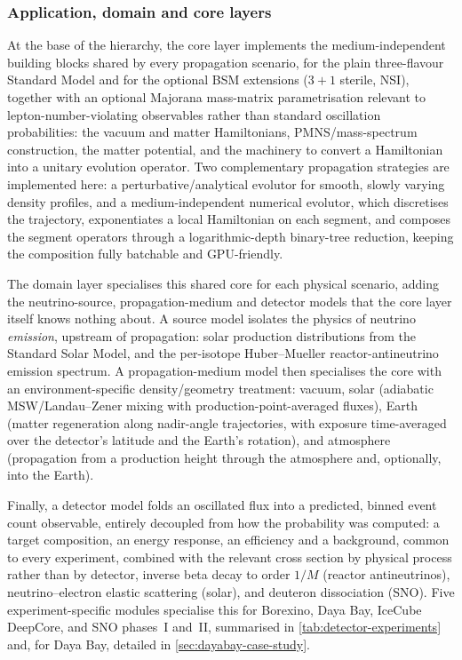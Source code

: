 \subsubsection{Application, domain and core layers}

At the base of the hierarchy, the core layer implements the medium-independent building blocks shared by every propagation scenario, for the plain three-flavour Standard Model and for the optional BSM extensions (\(3+1\) sterile, NSI), together with an optional Majorana mass-matrix parametrisation relevant to lepton-number-violating observables rather than standard oscillation probabilities: the vacuum and matter Hamiltonians, PMNS/mass-spectrum construction, the matter potential, and the machinery to convert a Hamiltonian into a unitary evolution operator. Two complementary propagation strategies are implemented here: a perturbative/analytical evolutor for smooth, slowly varying density profiles, and a medium-independent numerical evolutor, which discretises the trajectory, exponentiates a local Hamiltonian on each segment, and composes the segment operators through a logarithmic-depth binary-tree reduction, keeping the composition fully batchable and GPU-friendly.

The domain layer specialises this shared core for each physical scenario, adding the neutrino-source, propagation-medium and detector models that the core layer itself knows nothing about. A source model isolates the physics of neutrino \emph{emission}, upstream of propagation: solar production distributions from the Standard Solar Model, and the per-isotope Huber--Mueller \parencite{Huber2011,Mueller2011} reactor-antineutrino emission spectrum. A propagation-medium model then specialises the core with an environment-specific density/geometry treatment: vacuum, solar (adiabatic MSW/Landau--Zener mixing with production-point-averaged fluxes), Earth (matter regeneration along nadir-angle trajectories, with exposure time-averaged over the detector's latitude and the Earth's rotation), and atmosphere (propagation from a production height through the atmosphere and, optionally, into the Earth).

\label{sec:detector-layer}
Finally, a detector model folds an oscillated flux into a predicted, binned event count observable, entirely decoupled from how the probability was computed: a target composition, an energy response, an efficiency and a background, common to every experiment, combined with the relevant cross section by physical process rather than by detector, inverse beta decay to order \(1/M\) \parencite{VogelBeacom1999} (reactor antineutrinos), neutrino--electron elastic scattering (solar), and deuteron dissociation (SNO). Five experiment-specific modules specialise this for Borexino, Daya Bay, IceCube DeepCore, and SNO phases~I and~II, summarised in \cref{tab:detector-experiments} and, for Daya Bay, detailed in \cref{sec:dayabay-case-study}.

